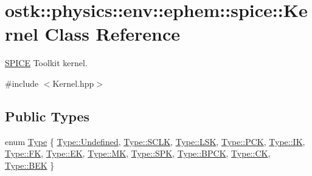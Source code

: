 \hypertarget{classostk_1_1physics_1_1env_1_1ephem_1_1spice_1_1_kernel}{}\section{ostk\+:\+:physics\+:\+:env\+:\+:ephem\+:\+:spice\+:\+:Kernel Class Reference}
\label{classostk_1_1physics_1_1env_1_1ephem_1_1spice_1_1_kernel}


\hyperlink{classostk_1_1physics_1_1env_1_1ephem_1_1_s_p_i_c_e}{S\+P\+I\+CE} Toolkit kernel.  




{\ttfamily \#include $<$Kernel.\+hpp$>$}

\subsection*{Public Types}
\begin{DoxyCompactItemize}
\item 
enum \hyperlink{classostk_1_1physics_1_1env_1_1ephem_1_1spice_1_1_kernel_a76d560bbface15a0cb24cd82e9a93d77}{Type} \{ \newline
\hyperlink{classostk_1_1physics_1_1env_1_1ephem_1_1spice_1_1_kernel_a76d560bbface15a0cb24cd82e9a93d77aec0fc0100c4fc1ce4eea230c3dc10360}{Type\+::\+Undefined}, 
\hyperlink{classostk_1_1physics_1_1env_1_1ephem_1_1spice_1_1_kernel_a76d560bbface15a0cb24cd82e9a93d77ae5ebe7b9d4b13b67cb85ac2febe4aca2}{Type\+::\+S\+C\+LK}, 
\hyperlink{classostk_1_1physics_1_1env_1_1ephem_1_1spice_1_1_kernel_a76d560bbface15a0cb24cd82e9a93d77a1352b10452a6331f4858173133cad49d}{Type\+::\+L\+SK}, 
\hyperlink{classostk_1_1physics_1_1env_1_1ephem_1_1spice_1_1_kernel_a76d560bbface15a0cb24cd82e9a93d77abed028f19aa93adb7f45e064155e5278}{Type\+::\+P\+CK}, 
\newline
\hyperlink{classostk_1_1physics_1_1env_1_1ephem_1_1spice_1_1_kernel_a76d560bbface15a0cb24cd82e9a93d77a7ab2200d24b19f1824cef3f53b5b69ca}{Type\+::\+IK}, 
\hyperlink{classostk_1_1physics_1_1env_1_1ephem_1_1spice_1_1_kernel_a76d560bbface15a0cb24cd82e9a93d77a8c8ba29dafd95af91e280d1e80b81773}{Type\+::\+FK}, 
\hyperlink{classostk_1_1physics_1_1env_1_1ephem_1_1spice_1_1_kernel_a76d560bbface15a0cb24cd82e9a93d77a6aa451b53d492a8f5a2fa1fa2855be8b}{Type\+::\+EK}, 
\hyperlink{classostk_1_1physics_1_1env_1_1ephem_1_1spice_1_1_kernel_a76d560bbface15a0cb24cd82e9a93d77afbd1e7ba9564863b88d5c43cb833afaf}{Type\+::\+MK}, 
\newline
\hyperlink{classostk_1_1physics_1_1env_1_1ephem_1_1spice_1_1_kernel_a76d560bbface15a0cb24cd82e9a93d77aa77fe9806504467c944718a3ce1ed5cb}{Type\+::\+S\+PK}, 
\hyperlink{classostk_1_1physics_1_1env_1_1ephem_1_1spice_1_1_kernel_a76d560bbface15a0cb24cd82e9a93d77a357e2ff99b2ce7d86f78fca1353088ec}{Type\+::\+B\+P\+CK}, 
\hyperlink{classostk_1_1physics_1_1env_1_1ephem_1_1spice_1_1_kernel_a76d560bbface15a0cb24cd82e9a93d77a534ac75c2e8ac3e3fe7bc32bb8c6e34a}{Type\+::\+CK}, 
\hyperlink{classostk_1_1physics_1_1env_1_1ephem_1_1spice_1_1_kernel_a76d560bbface15a0cb24cd82e9a93d77a23d71b8d68c6f4869b29ed158e97c88a}{Type\+::\+B\+EK}
 \}
\end{DoxyCompactItemize}
